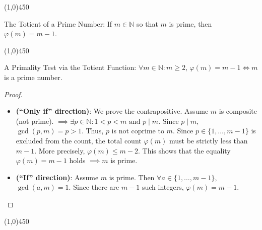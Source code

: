 \begin{center}
    \vspace{10pt}
    \line(1,0){450}
    \vspace{25pt}
\end{center}


\begin{theorem}
\label{thm:totient_prime}
The Totient of a Prime Number: If $m \in \mathbb{N}$ so that $m$ is prime, then $\varphi(m) = m - 1$.
\end{theorem}

\begin{center}
    \vspace{10pt}
    \line(1,0){450}
    \vspace{25pt}
\end{center}

\begin{theorem}
\label{thm:primality_test}
A Primality Test via the Totient Function: $\forall m \in \mathbb{N} : m \geq 2$, $\varphi(m) = m - 1 \iff m$ is a prime number.
\end{theorem}
\begin{proof}
    \leavevmode
\begin{itemize}
    \item[($\Rightarrow$)] \textbf{(``Only if'' direction)}: We prove the contrapositive. Assume $m$ is composite (not prime). $\implies \exists p \in \mathbb{N} : 1 < p < m \text{ and } p \mid m$.
    Since $p \mid m$, $\gcd(p, m) = p > 1$. Thus, $p$ is not coprime to $m$. Since $p \in \{1, \dots, m-1\}$ is excluded from the count, the total count $\varphi(m)$ must be strictly less than $m-1$. More precisely, $\varphi(m) \leq m - 2$. This shows that the equality $\varphi(m) = m - 1$ holds $\implies m$ is prime.
    \item[($\Leftarrow$)] \textbf{(``If'' direction)}: Assume $m$ is prime. Then $\forall a \in \{1, \dots, m-1\}$, $\gcd(a, m) = 1$. Since there are $m-1$ such integers, $\varphi(m) = m - 1$. \qedhere
\end{itemize}
\end{proof}

\begin{center}
    \vspace{10pt}
    \line(1,0){450}
    \vspace{25pt}
\end{center}

